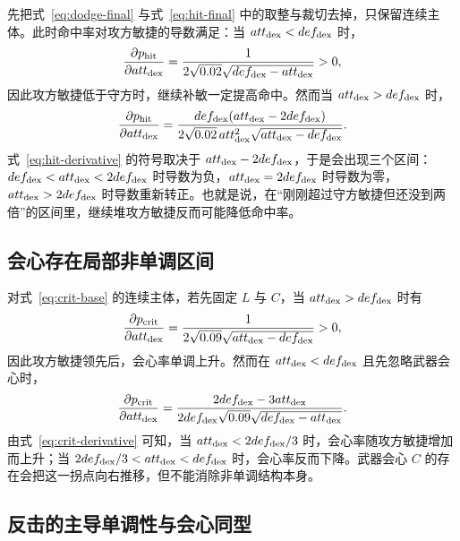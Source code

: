 先把式~\eqref{eq:dodge-final} 与式~\eqref{eq:hit-final} 中的取整与裁切去掉，只保留连续主体。此时命中率对攻方敏捷的导数满足：当 $att_{\mathrm{dex}}<def_{\mathrm{dex}}$ 时，
\begin{equation}
    \frac{\partial p_{\mathrm{hit}}}{\partial att_{\mathrm{dex}}} = \frac{1}{2\sqrt{0.02}\sqrt{def_{\mathrm{dex}}-att_{\mathrm{dex}}}} > 0,
\end{equation}
因此攻方敏捷低于守方时，继续补敏一定提高命中。然而当 $att_{\mathrm{dex}}>def_{\mathrm{dex}}$ 时，
\begin{equation}
    \frac{\partial p_{\mathrm{hit}}}{\partial att_{\mathrm{dex}}}
    = \frac{def_{\mathrm{dex}}(att_{\mathrm{dex}}-2def_{\mathrm{dex}})}{2\sqrt{0.02}\,att_{\mathrm{dex}}^2\sqrt{att_{\mathrm{dex}}-def_{\mathrm{dex}}}}.
    \label{eq:hit-derivative}
\end{equation}
式~\eqref{eq:hit-derivative} 的符号取决于 $att_{\mathrm{dex}}-2def_{\mathrm{dex}}$，于是会出现三个区间：$def_{\mathrm{dex}}<att_{\mathrm{dex}}<2def_{\mathrm{dex}}$ 时导数为负，$att_{\mathrm{dex}}=2def_{\mathrm{dex}}$ 时导数为零，$att_{\mathrm{dex}}>2def_{\mathrm{dex}}$ 时导数重新转正。也就是说，在“刚刚超过守方敏捷但还没到两倍”的区间里，继续堆攻方敏捷反而可能降低命中率。

\subsection{会心存在局部非单调区间}

对式~\eqref{eq:crit-base} 的连续主体，若先固定 $L$ 与 $C$，当 $att_{\mathrm{dex}}>def_{\mathrm{dex}}$ 时有
\begin{equation}
    \frac{\partial p_{\mathrm{crit}}}{\partial att_{\mathrm{dex}}} = \frac{1}{2\sqrt{0.09}\sqrt{att_{\mathrm{dex}}-def_{\mathrm{dex}}}} > 0,
\end{equation}
因此攻方敏捷领先后，会心率单调上升。然而在 $att_{\mathrm{dex}}<def_{\mathrm{dex}}$ 且先忽略武器会心时，
\begin{equation}
    \frac{\partial p_{\mathrm{crit}}}{\partial att_{\mathrm{dex}}} = \frac{2def_{\mathrm{dex}}-3att_{\mathrm{dex}}}{2def_{\mathrm{dex}}\sqrt{0.09}\sqrt{def_{\mathrm{dex}}-att_{\mathrm{dex}}}}.
    \label{eq:crit-derivative}
\end{equation}
由式~\eqref{eq:crit-derivative} 可知，当 $att_{\mathrm{dex}}<2def_{\mathrm{dex}}/3$ 时，会心率随攻方敏捷增加而上升；当 $2def_{\mathrm{dex}}/3<att_{\mathrm{dex}}<def_{\mathrm{dex}}$ 时，会心率反而下降。武器会心 $C$ 的存在会把这一拐点向右推移，但不能消除非单调结构本身。

\subsection{反击的主导单调性与会心同型}

